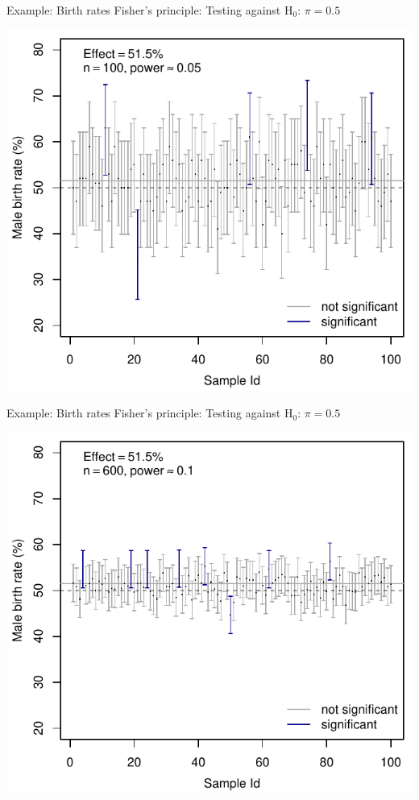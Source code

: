 \documentclass[aspectratio=169]{beamer}
\begin{document}
\begin{frame}[fragile]{Example: Birth rates}
  {Fisher's principle: Testing against H$_0$: $\pi = 0.5$}
  \begin{center}
    \includegraphics[scale=.7]{fig/ci_low}
  \end{center}
\end{frame}


\begin{frame}[fragile]{Example: Birth rates}
  {Fisher's principle: Testing against H$_0$: $\pi = 0.5$}
  \begin{center}
    \includegraphics[scale=.7]{fig/ci_medium}
  \end{center}
\end{frame}
\end{document}

